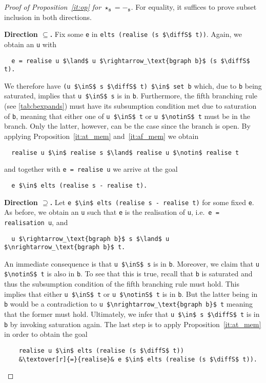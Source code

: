 \documentclass[sigplan,10pt,anonymous,review]{acmart}
\newcommand{\textover}[3][l]{%
 \makebox[\widthof{#3}][#1]{#2}%
}
\newcommand{\diffS}{-_\text{s}}
\newcommand{\inS}{\in_\text{s}}
\newcommand{\notinS}{\notin_\text{s}}
\begin{document}
\begin{proof}[Proof of Proposition~\ref{it:op} for $\star_\texttt{s} = -_\texttt{s}$]
  For equality, it suffices to prove subset inclusion in both directions.

  \textbf{Direction $\subseteq$. } Fix some \lstinline!e! in \lstinline!elts (realise (s $\diffS$ t))!.
  Again, we obtain an \lstinline!u! with 
\begin{lstlisting}
  e = realise u $\land$ u $\rightarrow_\text{bgraph b}$ (s $\diffS$ t).
\end{lstlisting}
  We therefore have \lstinline!(u $\inS$ s $\diffS$ t) $\in$ set b! which, due to \lstinline!b! being saturated, implies that \lstinline!u $\inS$ s! is in \lstinline!b!.
  Furthermore, the fifth branching rule (see \autoref{tab:bexpands}) must have its subsumption condition met due to saturation of \lstinline!b!, meaning that either one of \lstinline!u $\inS$ t! or \lstinline!u $\notinS$ t! must be in the branch.
  Only the latter, however, can be the case since the branch is open.
  By applying Proposition~\ref{it:at_mem} and~\ref{it:af_mem} we obtain
\begin{lstlisting}
  realise u $\in$ realise s $\land$ realise u $\notin$ realise t
\end{lstlisting}
  and together with \lstinline!e = realise u! we arrive at the goal 
\begin{lstlisting}
  e $\in$ elts (realise s - realise t).
\end{lstlisting}

\textbf{Direction $\supseteq$. } Let \lstinline[columns=fullflexible]!e $\in$ elts (realise s - realise t)! for some fixed \lstinline!e!.
  As before, we obtain an \lstinline!u! such that \lstinline!e! is the realisation of \lstinline!u!, i.e.\ \lstinline!e = realisation u!, and
\begin{lstlisting}
  u $\rightarrow_\text{bgraph b}$ s $\land$ u $\nrightarrow_\text{bgraph b}$ t.
\end{lstlisting}
  An immediate consequence is that \lstinline!u $\inS$ s! is in \lstinline!b!.
  Moreover, we claim that \lstinline!u $\notinS$ t! is also in \lstinline!b!.
  To see that this is true, recall that \lstinline!b! is saturated and thus the subsumption condition of the fifth branching rule must hold.
  This implies that either \lstinline!u $\inS$ t! or \lstinline!u $\notinS$ t! is in \lstinline!b!.
  But the latter being in \lstinline!b! would be a contradiction to \lstinline!u $\nrightarrow_\text{bgraph b}$ t! meaning that the former must hold.
  Ultimately, we infer that \lstinline!u $\in$ s $\diffS$ t! is in \lstinline!b! by invoking saturation again.
  The last step is to apply Proposition~\ref{it:at_mem} in order to obtain the goal
  \begin{lstlisting}
    realise u $\in$ elts (realise (s $\diffS$ t))
    &\textover[r]{=}{realise}& e $\in$ elts (realise (s $\diffS$ t)).
  \end{lstlisting}
\end{proof}
\end{document}
